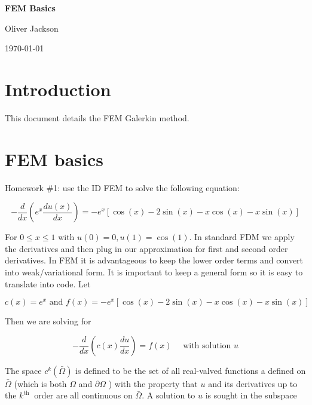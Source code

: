 \documentclass[12pt, oneside]{book}
\begin{document}
\begin{titlepage}
    \centering
    
    \vspace*{3cm} 
    
    {\Huge \textbf{FEM Basics}\par}
    
    \vspace*{3cm} 
    \vfill
    
    {\small Oliver Jackson\par}
    
    \vspace*{0.5cm} 

    {\small \today\par}
\end{titlepage}


\tableofcontents

\cleardoublepage
{}

\chapter{Introduction}

This document details the FEM Galerkin method. 

\chapter{FEM basics}

Homework \#1: use the ID FEM to solve the following equation:

$$
-\frac{d}{d x}\left(e^{x} \frac{d u(x)}{d x}\right)=-e^{x}[\cos (x)-2 \sin (x)-x \cos (x)-x \sin (x)]
$$

For $0 \leq x \leq 1$ with $u(0)=0, u(1)=\cos (1)$. In standard FDM we apply the derivatives and then plug in our approximation for first and second order derivatives. In FEM it is advantageous to keep the lower order terms and convert into weak/variational form. It is important to keep a general form so it is easy to translate into code. Let

$$
c(x)=e^{x} \text { and } f(x)=-e^{x}[\cos (x)-2 \sin (x)-x \cos (x)-x \sin (x)]
$$

Then we are solving for

$$
-\frac{d}{d x}\left(c(x) \frac{d u}{d x}\right)=f(x) \quad \text { with solution } u
$$

The space $c^{k}(\bar{\Omega})$ is defined to be the set of all real-valved functions a defined on $\bar{\Omega}$ (which is both $\Omega$ and $\partial \Omega$ ) with the property that $u$ and its derivatives up to the $k^{\text {th }}$ order are all continuous on $\bar{\Omega}$. A solution to $u$ is sought in the subspace
\end{document}
